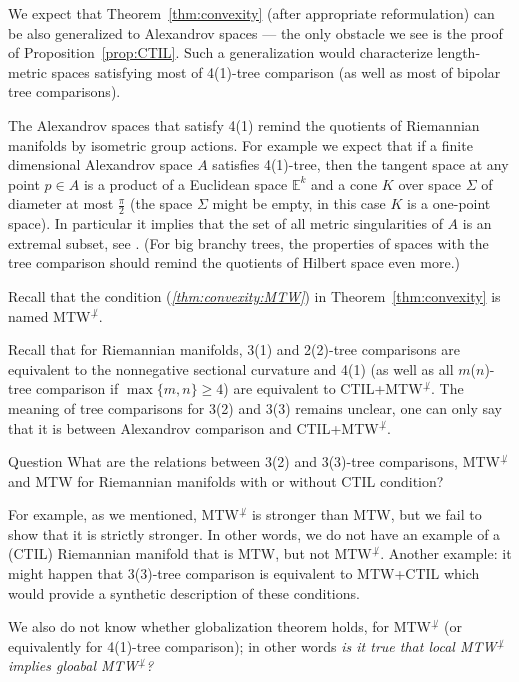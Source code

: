 We expect that Theorem~\ref{thm:convexity} (after appropriate reformulation) can be also generalized to Alexandrov spaces --- the only obstacle we see is the proof of Proposition~\ref{prop:CTIL}.
Such a generalization would characterize length-metric spaces satisfying most of 4(1)-tree comparison (as well as most of bipolar tree comparisons).

The Alexandrov spaces that satisfy 4(1) remind the quotients of Riemannian manifolds by isometric group actions. 
For example we expect that if a finite dimensional Alexandrov space $A$ satisfies 4(1)-tree, then the tangent space at any point $p\in A$ is a product of a Euclidean space $\mathbb{E}^k$ and a cone $K$ over space $\Sigma$ of diameter at most $\tfrac\pi2$ (the space $\Sigma$ might be empty, in this case $K$ is a one-point space).
In particular it implies that the set of all metric singularities of $A$ is an extremal subset, see \cite{perelman-petrunin}.
(For big branchy trees, the properties of spaces with the tree comparison should remind the quotients of Hilbert space even more.)

Recall that the condition (\textit{\ref{thm:convexity:MTW}}) in Theorem~\ref{thm:convexity} is named MTW$^{\not\perp}$.

Recall that for Riemannian manifolds, 3(1) and 2(2)-tree comparisons are equivalent to the nonnegative sectional curvature and 4(1) (as well as all $m$($n$)-tree comparison if $\max\{m,n\}\ge 4$) are equivalent to CTIL+MTW$^{\not\perp}$.
The meaning of tree comparisons for 3(2) and 3(3) remains unclear, one can only say that it is between Alexandrov comparison and CTIL+MTW$^{\not\perp}$.

\begin{thm}{Question}
What are the relations between 3(2) and 3(3)-tree comparisons,  MTW$^{\not\perp}$ and MTW for Riemannian manifolds with or without CTIL condition?
\end{thm}

For example, as we mentioned, MTW$^{\not\perp}$ is stronger than MTW, but we fail to show that it is strictly stronger.
In other words, we do not have an example of a (CTIL) Riemannian manifold that is MTW, but not MTW$^{\not\perp}$.
Another example: it might happen that 3(3)-tree comparison is equivalent to MTW+CTIL which would provide a synthetic description of these conditions.

We also do not know whether globalization theorem holds, for MTW$^{\not\perp}$ (or equivalently for 4(1)-tree comparison); in other words \emph{is it true that local MTW$^{\not\perp}$ implies gloabal MTW$^{\not\perp}$?}


